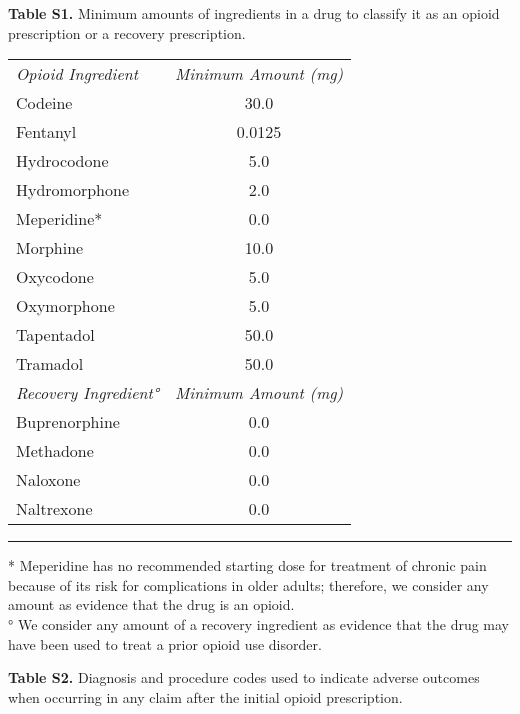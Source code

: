 \documentclass[10pt, letter]{article}
\begin{document}
\nolinenumbers

\newpage

\theendnotes

\newpage

\textbf{Table S1.} Minimum amounts of ingredients in a drug to classify it as an opioid prescription or a recovery prescription.

\begin{tabular}{lc}
\em Opioid Ingredient & \em Minimum Amount (mg) \\[0.5em]
Codeine & 30.0 \\
Fentanyl & 0.0125 \\
Hydrocodone & 5.0 \\
Hydromorphone & 2.0 \\
Meperidine* & 0.0 \\
Morphine & 10.0 \\
Oxycodone & 5.0 \\
Oxymorphone & 5.0 \\
Tapentadol & 50.0 \\
Tramadol & 50.0 \\[1em]
\em Recovery Ingredient° & \em Minimum Amount (mg) \\[0.5em]
Buprenorphine & 0.0 \\
Methadone & 0.0 \\
Naloxone & 0.0 \\
Naltrexone & 0.0 \\[1em]
\end{tabular}

\hrule

\footnotesize
* Meperidine has no recommended starting dose for treatment of chronic pain because of its risk for complications in older adults; therefore, we consider any amount as evidence that the drug is an opioid. \\
° We consider any amount of a recovery ingredient as evidence that the drug may have been used to treat a prior opioid use disorder.
\normalsize

\newpage

\textbf{Table S2.} Diagnosis and procedure codes used to indicate adverse outcomes when occurring in any claim after the initial opioid prescription.
\end{document}
